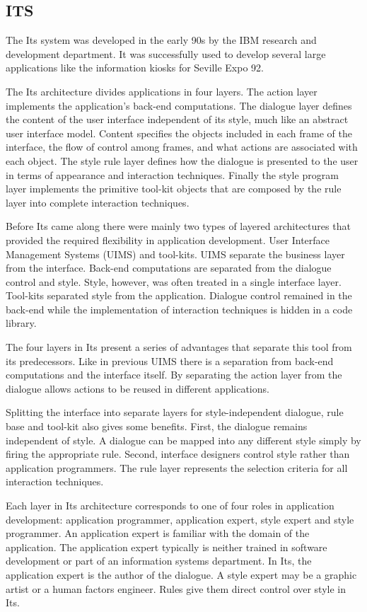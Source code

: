 \subsection{ITS}
\label{subsection:ITS}
The Its\cite{ITS} system was developed in the early 90s by the IBM research and development department. It was successfully used to develop several large applications like the information kiosks for Seville Expo 92.

The Its architecture divides applications in four layers. The action layer implements the application's back-end computations. The dialogue layer defines the content of the user interface independent of its style, much like an abstract user interface model. Content specifies the objects included in each frame of the interface, the flow of control among frames, and what actions are associated with each object. The style rule layer defines how the dialogue is presented to the user in terms of appearance and interaction techniques. Finally the style program layer implements the primitive tool-kit objects that are composed by the rule layer into complete interaction techniques.

Before Its came along there were mainly two types of layered architectures that provided the required flexibility in application development. User Interface Management Systems (UIMS) and tool-kits. UIMS separate the business layer from the interface. Back-end computations are separated from the dialogue control and style. Style, however, was often treated in a single interface layer. Tool-kits separated style from the application. Dialogue control remained in the back-end while the implementation of interaction techniques is hidden in a code library.

The four layers in Its present a series of advantages that separate this tool from its predecessors. Like in previous UIMS there is a separation from back-end computations and the interface itself. By separating the action layer from the dialogue allows actions to be reused in different applications.

Splitting the interface into separate layers for style-independent dialogue, rule base and tool-kit also gives some benefits. First, the dialogue remains independent of style. A dialogue can be mapped into any different style simply by firing the appropriate rule. Second, interface designers control style rather than application programmers. The rule layer represents the selection criteria for all interaction techniques.

Each layer in Its architecture corresponds to one of four roles in application development: application programmer, application expert, style expert and style programmer. An application expert is familiar with the domain of the application. The application expert typically is neither trained in software development or part of an information systems department. In Its, the application expert is the author of the dialogue. A style expert may be a graphic artist or a human factors engineer. Rules give them direct control over style in Its.

